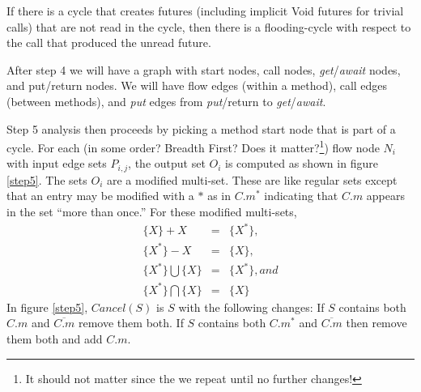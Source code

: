 \documentclass[12pt]{article}%
\begin{document}
If there is a cycle that creates futures (including implicit Void futures for trivial calls) that are not read
in the cycle, then there is a flooding-cycle with respect to the call that produced the unread future.

After step 4 we will have a graph with start nodes, call nodes, \emph{get}/\emph{await} nodes, and
put/return nodes. We will have flow edges (within a method), call edges (between methods), and \emph{put} edges from \emph{put}/return
to \emph{get}/\emph{await}.

Step 5 analysis then proceeds by picking a method start node that is part of a cycle.
For each (in some order? Breadth First? Does it matter?\footnote{It should not matter since the we repeat until no further changes!}) flow node $N_i$ with input edge sets $P_{i,j}$, the output set $O_i$ is
computed as shown in figure \ref{step5}. The sets $O_i$ are a modified multi-set. These are like regular sets except that an entry may be modified with
a $*$ as in $C.m^*$ indicating that $C.m$ appears in the set ``more than once.'' For these modified multi-sets, 
\begin{eqnarray*}
\{X\} + X & = & \{X^*\},\\
\{X^*\} - X & = & \{X\},\\
\{X^*\} \bigcup \{X\} & = & \{X^*\}, and \\
\{X^*\} \bigcap \{X\} & = & \{X\}
\end{eqnarray*} 
In figure \ref{step5},  $Cancel(S)$ is $S$ with the following changes:\newline
If $S$ contains both $C.m$ and $\overline{C.m}$ remove them both.\newline
If $S$ contains both $C.m^*$ and $\overline{C.m}$ then remove them both and add $C.m$.

\end{document}
